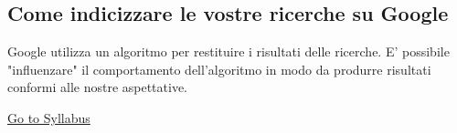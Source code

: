 \documentclass[a4paper,10pt]{article}
\begin{document}
	\subsection{Come indicizzare le vostre ricerche su Google}
		Google utilizza un algoritmo per restituire i risultati delle ricerche. E' possibile "influenzare" il comportamento dell'algoritmo in modo da produrre risultati
		conformi alle nostre aspettative.
	
	\href{Syllabus.html}{Go to Syllabus}
	
\end{document}
